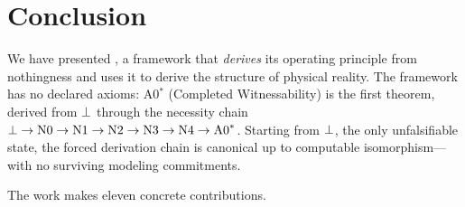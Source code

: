 
\section{Conclusion}
\label{sec:conclusion}

We have presented \Opoch{}, a framework that \emph{derives} its
operating principle from nothingness and uses it to derive the structure
of physical reality.  The framework has no declared axioms: A0$^*$
(Completed Witnessability) is the first theorem, derived from $\bot$
through the necessity chain $\bot \to \text{N0} \to \text{N1} \to
\text{N2} \to \text{N3} \to \text{N4} \to \text{A0}^*$.  Starting from
$\bot$, the only unfalsifiable state, the forced derivation chain is
canonical up to computable isomorphism---with no surviving modeling
commitments.

The work makes eleven concrete contributions.

